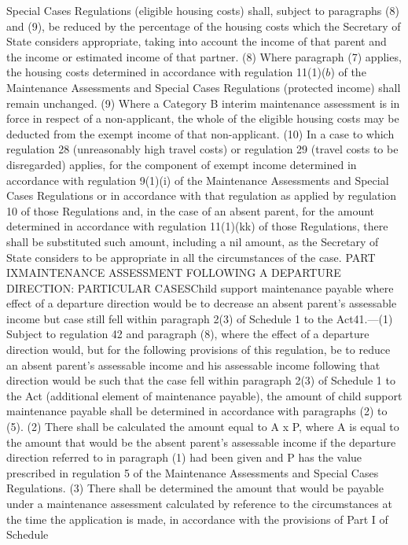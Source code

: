\documentclass[a4paper]{article}
\begin{document}
Special Cases Regulations (eligible housing costs) shall, subject to paragraphs
(8) and (9), be reduced by the percentage of the housing costs which the
Secretary of State considers appropriate, taking into account the income of that
parent and the income or estimated income of that partner.
(8) Where paragraph (7) applies, the housing costs determined in accordance with
regulation 11(1)($b$) of the Maintenance Assessments and Special Cases Regulations
(protected income) shall remain unchanged.
(9) Where a Category B interim maintenance assessment is in force in respect of
a non-applicant, the whole of the eligible housing costs may be deducted from
the exempt income of that non-applicant.
(10) In a case to which regulation 28 (unreasonably high travel costs) or
regulation 29 (travel costs to be disregarded) applies, for the component of
exempt income determined in accordance with regulation 9(1)(i) of the
Maintenance Assessments and Special Cases Regulations or in accordance with that
regulation as applied by regulation 10 of those Regulations and, in the case of
an absent parent, for the amount determined in accordance with regulation
11(1)(kk) of those Regulations, there shall be substituted such amount,
including a nil amount, as the Secretary of State considers to be appropriate in
all the circumstances of the case.
PART IXMAINTENANCE ASSESSMENT FOLLOWING A DEPARTURE DIRECTION: PARTICULAR
CASESChild support maintenance payable where effect of a departure direction
would be to decrease an absent parent’s assessable income but case still fell
within paragraph 2(3) of Schedule 1 to the Act41.—(1) Subject to regulation 42
and paragraph (8), where the effect of a departure direction would, but for the
following provisions of this regulation, be to reduce an absent parent’s
assessable income and his assessable income following that direction would be
such that the case fell within paragraph 2(3) of Schedule 1 to the Act
(additional element of maintenance payable), the amount of child support
maintenance payable shall be determined in accordance with paragraphs (2) to
(5).
(2) There shall be calculated the amount equal to A x P, where A is equal to the
amount that would be the absent parent’s assessable income if the departure
direction referred to in paragraph (1) had been given and P has the value
prescribed in regulation 5 of the Maintenance Assessments and Special Cases
Regulations.
(3) There shall be determined the amount that would be payable under a
maintenance assessment calculated by reference to the circumstances at the time
the application is made, in accordance with the provisions of Part I of Schedule
\end{document}
